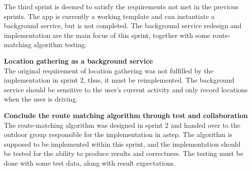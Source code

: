 The third sprint is deemed to satisfy the requirements not met in the previous sprints.
The app is currently a working template and can instantiate a background service, but is not completed. 
The background service redesign and implementation are the main focus of this sprint, together with some route-matching algorithm testing.

\textbf{Location gathering as a background service}\\
The original requirement of location gathering was not fulfilled by the implementation in sprint 2, thus, it must be reimplemented.
The background service should be sensitive to the user's current activity and only record locations when the user is driving.

\textbf{Conclude the route matching algorithm through test and collaboration}\\
The route-matching algorithm was designed in sprint 2 and handed over to the outdoor group responsible for the implementation in \gls{astep}.
The algorithm is supposed to be implemented within this sprint, and the implementation should be tested for the ability to produce results and correctness.
The testing must be done with some test data, along with result expectations.